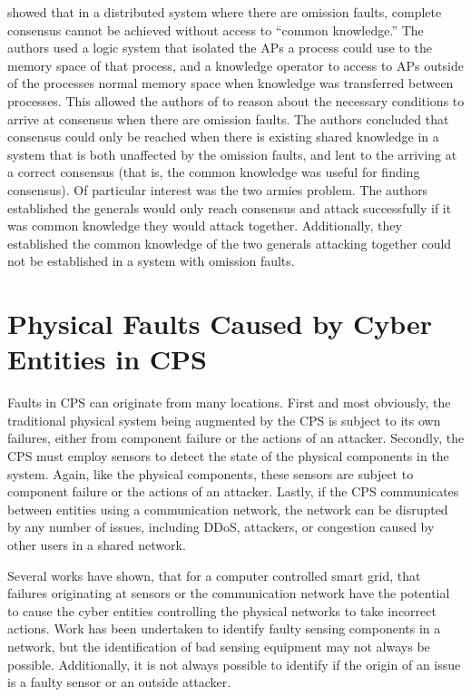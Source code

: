 \cite{knowledge-distributed} showed that in a distributed system where there are omission faults, complete consensus cannot be achieved without access to ``common knowledge.''
The authors used a logic system that isolated the \ac{AP}s a process could use to the memory space of that process, and a knowledge operator to access to \ac{AP}s outside of the processes normal memory space when knowledge was transferred between processes.
This allowed the authors of \cite{knowledge-distributed} to reason about the necessary conditions to arrive at consensus when there are omission faults.
The authors concluded that consensus could only be reached when there is existing shared knowledge in a system that is both unaffected by the omission faults, and lent to the arriving at a correct consensus (that is, the common knowledge was useful for finding consensus).
Of particular interest was the two armies problem.
The authors established the generals would only reach consensus and attack successfully if it was common knowledge they would attack together.
Additionally, they established the common knowledge of the two generals attacking together could not be established in a system with omission faults.

\section{Physical Faults Caused by Cyber Entities in CPS}

Faults in \ac{CPS} can originate from many locations.
First and most obviously, the traditional physical system being augmented by the CPS is subject to its own failures, either from component failure or the actions of an attacker.
Secondly, the \ac{CPS} must employ sensors to detect the state of the physical components in the system.
Again, like the physical components, these sensors are subject to component failure or the actions of an attacker.
Lastly, if the \ac{CPS} communicates between entities using a communication network, the network can be disrupted by any number of issues, including DDoS, attackers, or congestion caused by other users in a shared network.

Several works have shown\cite{Roth2012}\cite{HARINI}\cite{CYBERRESEARCHCALL}, that for a computer controlled smart grid, that failures originating at sensors or the communication network have the potential to cause the cyber entities controlling the physical networks to take incorrect actions.
Work has been undertaken to identify faulty sensing components in a network, but the identification of bad sensing equipment may not always be possible.
Additionally, it is not always possible to identify if the origin of an issue is a faulty sensor or an outside attacker.

